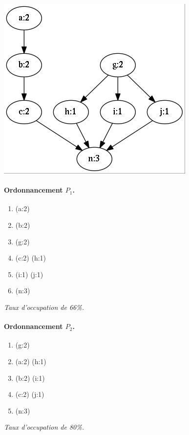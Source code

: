 \documentclass[11pt]{article}
\newenvironment{titledenumerate}[1]
  {\paragraph{#1} \begin{enumerate}}
  {\end{enumerate}}
\begin{document}
    \begin{multicols}{3}
      \begin{center}
        \includegraphics[width=0.9\linewidth]{fig/graph16a.jpg}
      \end{center}

      \begin{titledenumerate}{Ordonnancement $P_1$.}
        \item (a:2)
        \item (b:2)
        \item (g:2)
        \item (c:2) (h:1)
        \item (i:1) (j:1)
        \item (n:3)
      \end{titledenumerate}
      \emph{Taux d'occupation de 66\%.}

      \begin{titledenumerate}{Ordonnancement $P_2$.}
        \item (g:2)
        \item (a:2) (h:1)
        \item (b:2) (i:1)
        \item (c:2) (j:1)
        \item (n:3)
      \end{titledenumerate}
      \emph{Taux d'occupation de 80\%.}
    \end{multicols}
\end{document}
